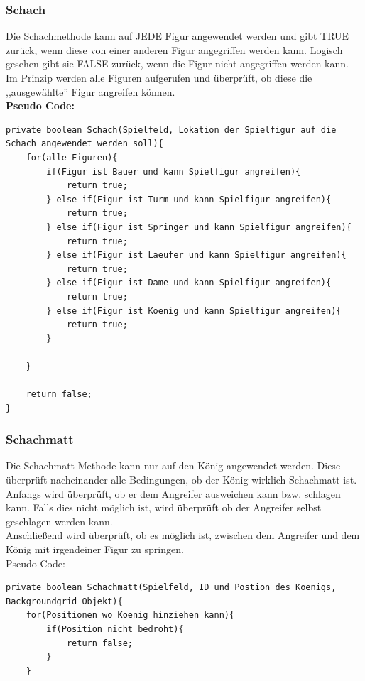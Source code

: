 \documentclass[12pt,a4paper]{article}
\begin{document}
{\subsubsection{Schach}
\label{SUBSUBSEC:check}

Die Schachmethode kann auf JEDE Figur angewendet werden und gibt TRUE zurück, wenn diese von einer anderen Figur angegriffen werden kann. Logisch gesehen gibt sie FALSE zurück, wenn die Figur nicht angegriffen werden kann. \\
Im Prinzip werden alle Figuren aufgerufen und überprüft, ob diese die ,,ausgewählte'' Figur angreifen können. \\
\newpage
\textbf{Pseudo Code:}

\lstset{language=Java}
\begin{lstlisting}
private boolean Schach(Spielfeld, Lokation der Spielfigur auf die Schach angewendet werden soll){
	for(alle Figuren){
		if(Figur ist Bauer und kann Spielfigur angreifen){
			return true;		
		} else if(Figur ist Turm und kann Spielfigur angreifen){
			return true;
		} else if(Figur ist Springer und kann Spielfigur angreifen){
			return true;
		} else if(Figur ist Laeufer und kann Spielfigur angreifen){
			return true;
		} else if(Figur ist Dame und kann Spielfigur angreifen){
			return true;
		} else if(Figur ist Koenig und kann Spielfigur angreifen){
			return true;
		}
		
	}
	
	return false;	
}
\end{lstlisting}

\subsubsection{Schachmatt}
\label{SUBSUBSEC:checkmate}

Die Schachmatt-Methode kann nur auf den König angewendet werden. Diese überprüft nacheinander alle Bedingungen, ob der König wirklich Schachmatt ist. Anfangs wird überprüft, ob er dem Angreifer ausweichen kann bzw. schlagen kann. Falls dies nicht möglich ist, wird überprüft ob der Angreifer selbst geschlagen werden kann. \\
Anschließend wird überprüft, ob es möglich ist, zwischen dem Angreifer und dem König mit irgendeiner Figur zu springen. \\
Pseudo Code:

\lstset{language=Java}
\begin{lstlisting}
private boolean Schachmatt(Spielfeld, ID und Postion des Koenigs, Backgroundgrid Objekt){
	for(Positionen wo Koenig hinziehen kann){
		if(Position nicht bedroht){
			return false;
		}
	}
	

\end{lstlisting}}
\end{document}
